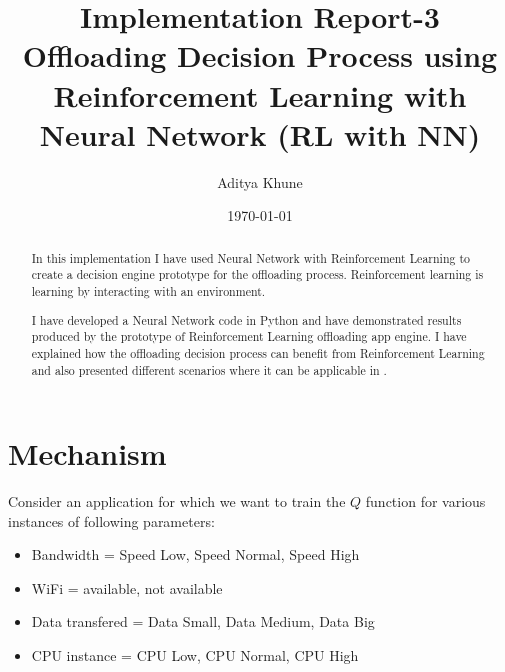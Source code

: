 \documentclass{article}
\begin{document}
\title{Implementation Report-3\\
Offloading Decision Process using Reinforcement Learning with Neural Network (RL with NN)}

\author{Aditya Khune}
\date{\today}  %
\maketitle


\tableofcontents


\begin{abstract}
In this implementation I have used Neural Network with Reinforcement Learning to create a decision engine prototype for the offloading process. Reinforcement learning is learning by interacting with an environment. 
\par
I have developed a Neural Network code in Python and have demonstrated results produced by the prototype of Reinforcement Learning offloading app engine.
I have explained how the offloading decision process can benefit from Reinforcement Learning and also presented different scenarios where it can be applicable in \cite{adityaRL}.
\end{abstract}



\section{Mechanism}
Consider an application for which we want to train the $Q$ function for various instances of following parameters:
\begin{itemize}
   \item Bandwidth = Speed Low, Speed Normal, Speed High
   \item WiFi = available, not available
   \item Data transfered = Data Small, Data Medium, Data Big
   \item CPU instance = CPU Low, CPU Normal, CPU High
\end{itemize}
\end{document}
